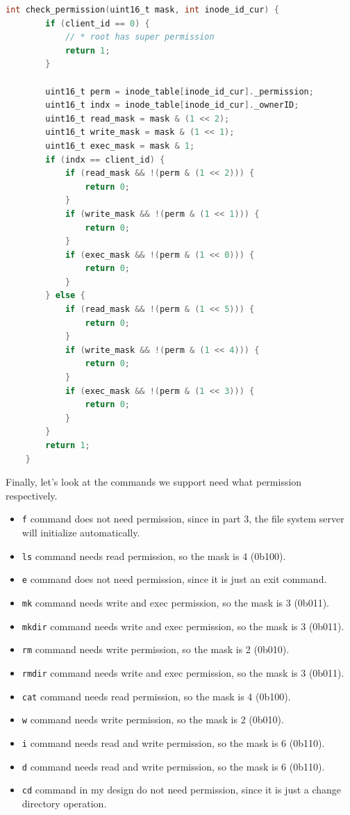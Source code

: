 \begin{lstlisting}[language=C]
    int check_permission(uint16_t mask, int inode_id_cur) {
        if (client_id == 0) {
            // * root has super permission
            return 1;
        }
    
        uint16_t perm = inode_table[inode_id_cur]._permission;
        uint16_t indx = inode_table[inode_id_cur]._ownerID;
        uint16_t read_mask = mask & (1 << 2);
        uint16_t write_mask = mask & (1 << 1);
        uint16_t exec_mask = mask & 1;
        if (indx == client_id) {
            if (read_mask && !(perm & (1 << 2))) {
                return 0;
            }
            if (write_mask && !(perm & (1 << 1))) {
                return 0;
            }
            if (exec_mask && !(perm & (1 << 0))) {
                return 0;
            }
        } else {
            if (read_mask && !(perm & (1 << 5))) {
                return 0;
            }
            if (write_mask && !(perm & (1 << 4))) {
                return 0;
            }
            if (exec_mask && !(perm & (1 << 3))) {
                return 0;
            }
        }
        return 1;
    }    
\end{lstlisting}

Finally, let's look at the commands we support need what permission respectively.
\begin{itemize}
    \item \texttt{f} command does not need permission, since in part 3, the file system server will initialize automatically.
    \item \texttt{ls} command needs read permission, so the mask is 4 (0b100).
    \item \texttt{e} command does not need permission, since it is just an exit command.
    \item \texttt{mk} command needs write and exec permission, so the mask is 3 (0b011).
    \item \texttt{mkdir} command needs write and exec permission, so the mask is 3 (0b011).
    \item \texttt{rm} command needs write permission, so the mask is 2 (0b010).
    \item \texttt{rmdir} command needs write and exec permission, so the mask is 3 (0b011).
    \item \texttt{cat} command needs read permission, so the mask is 4 (0b100).
    \item \texttt{w} command needs write permission, so the mask is 2 (0b010).
    \item \texttt{i} command needs read and write permission, so the mask is 6 (0b110).
    \item \texttt{d} command needs read and write permission, so the mask is 6 (0b110).
    \item \texttt{cd} command in my design do not need permission, since it is just a change directory operation.
\end{itemize}

